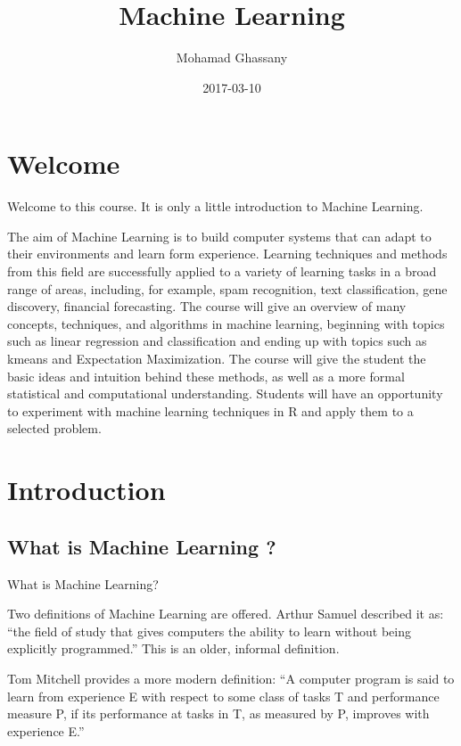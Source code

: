 \documentclass[]{book}
\title{Machine Learning}
\author{Mohamad Ghassany}
\date{2017-03-10}
\begin{document}
\maketitle

{
\setcounter{tocdepth}{2}
\tableofcontents
}
\chapter*{Welcome}\label{welcome}

Welcome to this course. It is only a little introduction to Machine
Learning.

The aim of Machine Learning is to build computer systems that can adapt
to their environments and learn form experience. Learning techniques and
methods from this field are successfully applied to a variety of
learning tasks in a broad range of areas, including, for example, spam
recognition, text classification, gene discovery, financial forecasting.
The course will give an overview of many concepts, techniques, and
algorithms in machine learning, beginning with topics such as linear
regression and classification and ending up with topics such as kmeans
and Expectation Maximization. The course will give the student the basic
ideas and intuition behind these methods, as well as a more formal
statistical and computational understanding. Students will have an
opportunity to experiment with machine learning techniques in R and
apply them to a selected problem.

\chapter*{Introduction}\label{introduction}

\section*{What is Machine Learning ?}\label{what-is-machine-learning}

What is Machine Learning?

Two definitions of Machine Learning are offered. Arthur Samuel described
it as: ``the field of study that gives computers the ability to learn
without being explicitly programmed.'' This is an older, informal
definition.

Tom Mitchell provides a more modern definition: ``A computer program is
said to learn from experience E with respect to some class of tasks T
and performance measure P, if its performance at tasks in T, as measured
by P, improves with experience E.''
\end{document}
